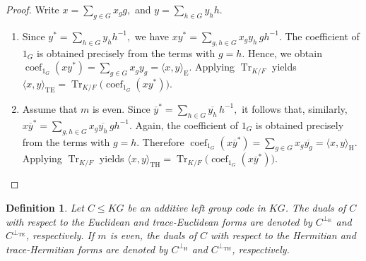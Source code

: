 \documentclass[11pt]{article}
\newtheorem{definition}[theorem]{Definition}
\begin{document}
\begin{proof}
Write
$
x=\sum_{g\in G} x_g g,$ and $
y=\sum_{h\in G} y_h h.
$

\begin{enumerate}
    \item Since
    $
    y^\ast=\sum_{h\in G} y_h h^{-1},
    $
    we have
    $
    xy^\ast
    =
    \sum_{g,h\in G} x_g y_h\,gh^{-1}.
    $
    The coefficient of $1_G$ is obtained precisely from the terms with $g=h$. Hence, we obtain
    $
    \operatorname{coef}_{1_G}(xy^\ast)
    =
    \sum_{g\in G} x_g y_g
    =
    \langle x,y\rangle_{\mathrm{E}}.
    $
    Applying $\operatorname{Tr}_{K/F}$ yields
    $
    \langle x,y\rangle_{\mathrm{TE}}
    =
    \operatorname{Tr}_{K/F}\!\bigl(\operatorname{coef}_{1_G}(xy^\ast)\bigr).
    $

    \item Assume that $m$ is even. Since
    $
    \overline{y}^\ast
    =
    \sum_{h\in G} \overline{y_h}\,h^{-1},
    $
    it follows that, similarly,
    $
    x\overline{y}^\ast
    =
    \sum_{g,h\in G} x_g\overline{y_h}\,gh^{-1}.
    $
    Again, the coefficient of $1_G$ is obtained precisely from the terms with $g=h$. Therefore
    $
    \operatorname{coef}_{1_G}(x\overline{y}^\ast)
    =
    \sum_{g\in G} x_g\overline{y_g}
    =
    \langle x,y\rangle_{\mathrm{H}}.
    $
    Applying $\operatorname{Tr}_{K/F}$ yields
    $
    \langle x,y\rangle_{\mathrm{TH}}
    =
    \operatorname{Tr}_{K/F}\!\bigl(\operatorname{coef}_{1_G}(x\overline{y}^\ast)\bigr).
    $
\end{enumerate}
\end{proof}


\begin{definition}
Let $C \leq KG$ be an additive left group code in $KG$. The duals of $C$ with respect to the Euclidean and trace-Euclidean forms are denoted by $C^{\perp_{\mathrm{E}}}$ and $C^{\perp_{\mathrm{TE}}}$, respectively. If $m$ is even, the duals of $C$ with respect to the Hermitian and trace-Hermitian forms are denoted by $C^{\perp_{\mathrm{H}}}$ and $C^{\perp_{\mathrm{TH}}}$, respectively.
\end{definition}
\end{document}
